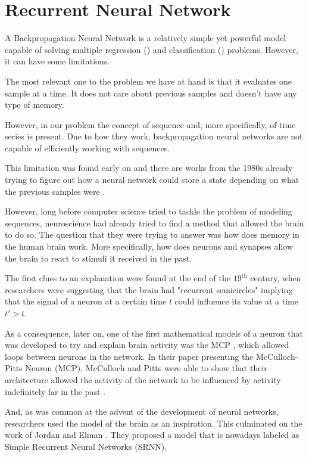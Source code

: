 \section{Recurrent Neural Network}\label{sec:RecurrentNeuralNetwork}

A Backpropagation Neural Network is a relatively simple yet powerful model capable of solving multiple regression (\cite{suresh2015particle}) and classification (\cite{paola1995review}) problems.
However, it can have some limitations.

The most relevant one to the problem we have at hand is that it evaluates one sample at a time.
It does not care about previous samples and doesn't have any type of memory.

However, in our problem the concept of sequence and, more specifically, of time series is present.
Due to how they work, backpropagation neural networks are not capable of efficiently working with sequences.

This limitation was found early on and there are works from the 1980s already trying to figure out how a neural network could store a state depending on what the previous samples were \cite{jordan1986serial}.

However, long before computer science tried to tackle the problem of modeling sequences, neuroscience had already tried to find a method that allowed the brain to do so.
The question that they were trying to answer was how does memory in the human brain work.
More specifically, how does neurons and synapses allow the brain to react to stimuli it received in the past.

The first clues to an explanation were found at the end of the $19^{\text{th}}$ century, when researchers were suggesting that the brain had "recurrent semicircles" \cite{espinosa2025importance} implying that the signal of a neuron at a certain time $t$ could influence its value at a time $t' > t$.

As a consequence, later on, one of the first mathematical models of a neuron that was developed to try and explain brain activity was the MCP \cite{mcculloch1943logical}, which allowed loops between neurons in the network.
In their paper presenting the McCulloch-Pitts Neuron (MCP), McCulloch and Pitts were able to show that their architecture allowed the activity of the network to be influenced by activity indefinitely far in the past \cite{mcculloch1943logical}.

And, as was common at the advent of the development of neural networks, researchers used the model of the brain as an inspiration.
This culminated on the work of Jordan \cite{jordan1986serial} and Elman \cite{elman1990finding}.
They proposed a model that is nowadays labeled as Simple Recurrent Neural Networks (SRNN).

